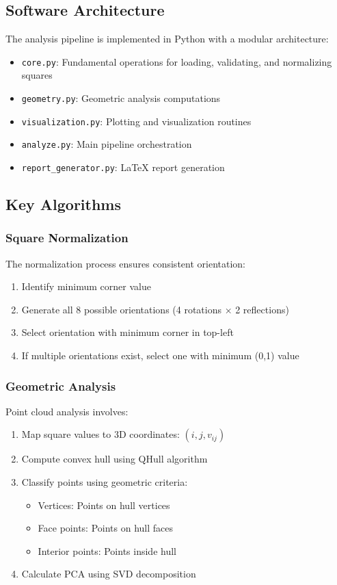 \documentclass[11pt]{article}
\begin{document}
\subsection{Software Architecture}
The analysis pipeline is implemented in Python with a modular architecture:
\begin{itemize}
    \item \texttt{core.py}: Fundamental operations for loading, validating, and normalizing squares
    \item \texttt{geometry.py}: Geometric analysis computations
    \item \texttt{visualization.py}: Plotting and visualization routines
    \item \texttt{analyze.py}: Main pipeline orchestration
    \item \texttt{report\_generator.py}: LaTeX report generation
\end{itemize}

\subsection{Key Algorithms}
\subsubsection{Square Normalization}
The normalization process ensures consistent orientation:
\begin{enumerate}
    \item Identify minimum corner value
    \item Generate all 8 possible orientations (4 rotations × 2 reflections)
    \item Select orientation with minimum corner in top-left
    \item If multiple orientations exist, select one with minimum (0,1) value
\end{enumerate}

\subsubsection{Geometric Analysis}
Point cloud analysis involves:
\begin{enumerate}
    \item Map square values to 3D coordinates: $(i, j, v_{ij})$
    \item Compute convex hull using QHull algorithm
    \item Classify points using geometric criteria:
    \begin{itemize}
        \item Vertices: Points on hull vertices
        \item Face points: Points on hull faces
        \item Interior points: Points inside hull
    \end{itemize}
    \item Calculate PCA using SVD decomposition
\end{enumerate}
\end{document}
